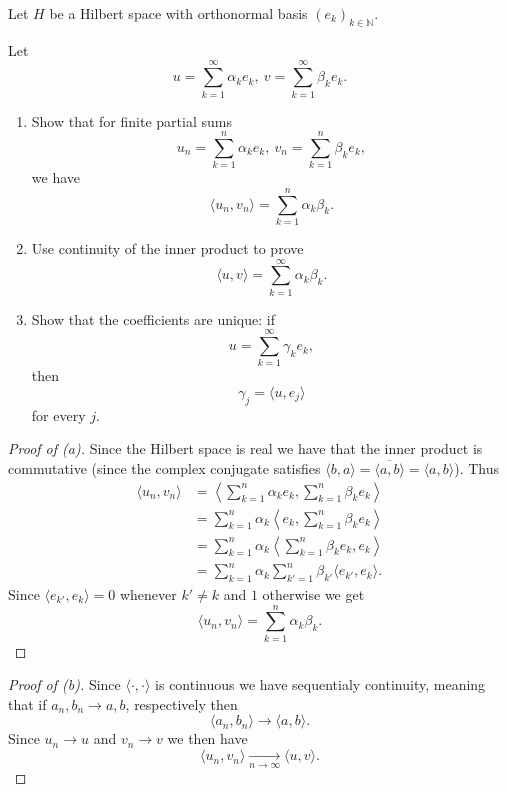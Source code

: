 \begin{prob}
    Let $H$ be a Hilbert space with orthonormal basis 
    $(e_k)_{k\in\mathbb N}$. 

    Let 
    \[
        u = \sum_{k=1}^\infty \alpha_k e_k, \ 
        v = \sum_{k=1}^\infty \beta_k e_k.
    \]

    \begin{enumerate}[label=\alph*)]
        \item Show that for finite partial sums 
            \[
                u_n = \sum_{k=1}^n \alpha_k e_k, \ 
                v_n = \sum_{k=1}^n \beta_k e_k, 
            \]
            we have 
            \[
                \langle u_n, v_n \rangle 
                = \sum_{k=1}^n \alpha_k \beta_k.
            \]
        \item Use continuity of the inner product to prove 
            \[
                \langle u,v \rangle = \sum_{k=1}^\infty  
                \alpha_k \beta_k.
            \]
        \item Show that the coefficients are unique: if 
            \[
                u = \sum_{k=1}^\infty \gamma_k e_k, 
            \]
            then 
            \[
                \gamma_j = \langle u,e_j\rangle
            \]
            for every $j$.
    \end{enumerate}
\end{prob}
\begin{proof}[Proof of (a)]
    Since the Hilbert space is real we have that the inner 
    product is commutative (since the complex conjugate satisfies
    $\langle b, a \rangle = \overline{\langle a, b \rangle} = 
    \langle a ,b \rangle$). Thus 
    \begin{align*}
        \langle u_n, v_n \rangle 
        &= \left\langle \sum_{k=1}^n \alpha_k e_k, 
        \sum_{k=1}^n \beta_k e_k\right\rangle \\ 
        &= 
        \sum_{k=1}^n \alpha_k 
        \left\langle e_k, \sum_{k=1}^n \beta_k e_k \right\rangle 
        \\ 
        &= 
        \sum_{k=1}^n \alpha_k 
        \left\langle \sum_{k=1}^n \beta_k e_k, e_k \right\rangle
        \\ 
        &= 
        \sum_{k=1}^n \alpha_k \sum_{k'=1}^n \beta_{k'} 
        \langle e_{k'}, e_k \rangle. 
    \end{align*}
    Since $\langle e_{k'}, e_k \rangle = 0$ whenever $k' \neq k$ and 
    $1$ otherwise we get 
    \[
        \langle u_n, v_n \rangle 
        = \sum_{k=1}^n \alpha_k \beta_k.
    \]
\end{proof}
\begin{proof}[Proof of (b)]
    Since $\langle \cdot, \cdot \rangle$ is continuous 
    we have sequentialy continuity, meaning that if 
    $a_n, b_n \to a, b$, respectively then 
    \[
        \langle a_n, b_n \rangle \to \langle a, b \rangle.
    \] 
    Since $u_n \to u$ and $v_n \to v$ we then have 
    \[
        \langle u_n, v_n \rangle 
        \underset{n\to\infty}{\to} \langle u,v\rangle.
    \]
\end{proof}

